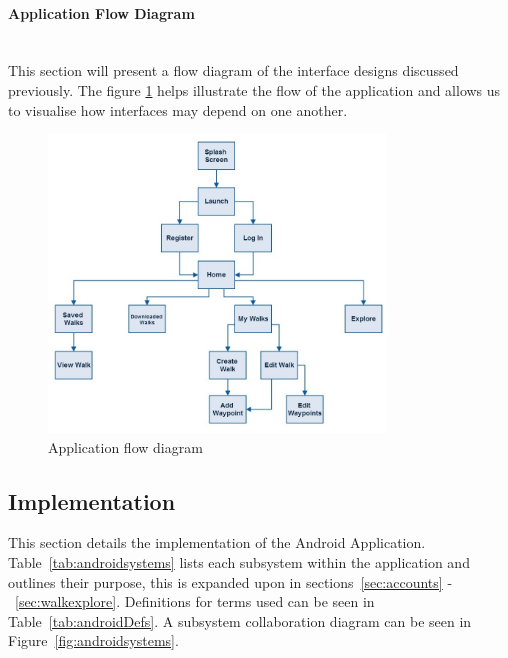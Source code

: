 \documentclass[11pt,a4paper]{report}
\begin{document}
\paragraph*{Application Flow Diagram}\mbox{}\\

This section will present a flow diagram of the interface designs discussed previously. The figure \ref{fig:flow} helps illustrate the flow of the application and allows us to visualise how interfaces may depend on one another.

\begin{figure}[H]
    \centering
    \includegraphics[width=0.8\textwidth]{chris/flow}
    \caption{Application flow diagram}
    \label{fig:flow}
\end{figure}

\subsection{Implementation}
This section details the implementation of the Android Application. Table~\ref{tab:androidsystems} lists each subsystem within the application and outlines their purpose, this is expanded upon in sections~\ref{sec:accounts} -~\ref{sec:walkexplore}. Definitions for terms used can be seen in Table~\ref{tab:androidDefs}. A subsystem collaboration diagram can be seen in Figure~\ref{fig:androidsystems}.
\end{document}
